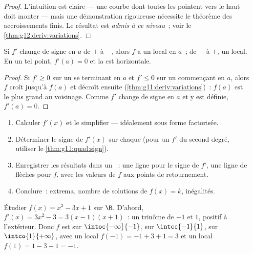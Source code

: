 \begin{proof}
L'intuition est claire --- une courbe dont toutes les  pointent
vers le haut doit monter --- mais une démonstration rigoureuse nécessite
le théorème des accroissements finis. Le résultat est \emph{admis à ce
niveau}~; voir le \cref{thm:g12:deriv:variations}.
\end{proof}

\begin{proposition}[Extrema]\label{prop:g11:deriv:extrema}
Si $f'$ change de signe en $a$ de $+$ à $-$, alors $f$ a un 
local en $a$~; de $-$ à $+$, un  local. En un tel point,
$f'(a) = 0$ et la  est horizontale.
\end{proposition}

\begin{proof}
Si $f' \geq 0$ sur un  se terminant en $a$ et $f' \leq 0$ sur
un  commençant en $a$, alors $f$ croît jusqu'à $f(a)$ et
décroît ensuite (\cref{thm:g11:deriv:variations})~: $f(a)$ est le plus
grand au voisinage. Comme $f'$ change de signe en $a$ et y est définie,
$f'(a) = 0$.
\end{proof}

\begin{method}\label{met:g11:deriv:study}
\begin{enumerate}
  \item Calculer $f'(x)$ et le simplifier --- idéalement sous forme
        factorisée.
  \item Déterminer le signe de $f'(x)$ sur chaque  (pour un
        $f'$ du second degré, utiliser le \cref{thm:g11:quad:sign}).
  \item Enregistrer les résultats dans un \emph{}~:
        une ligne pour le signe de $f'$, une ligne de flèches pour $f$,
        avec les valeurs de $f$ aux points de retournement.
  \item Conclure~: extrema, nombre de solutions de $f(x) = k$,
        inégalités.
\end{enumerate}
\end{method}

\begin{example}\label{ex:g11:deriv:study}
Étudier $f(x) = x^3 - 3x + 1$ sur $\R$. D'abord,
$f'(x) = 3x^2 - 3 = 3(x-1)(x+1)$~: un trinôme de  $-1$ et $1$,
positif à l'extérieur. Donc $f$ est  sur
$\intoc{-\infty}{-1}$,  sur $\intcc{-1}{1}$,  sur
$\intco{1}{+\infty}$, avec un  local $f(-1) = -1 + 3 + 1 = 3$ et
un  local $f(1) = 1 - 3 + 1 = -1$.
\end{example}


